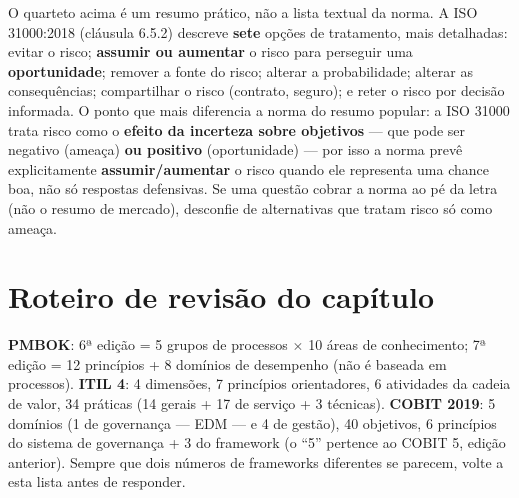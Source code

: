 \begin{cuidado}
O quarteto acima é um resumo prático, não a lista textual da norma. A ISO
31000:2018 (cláusula 6.5.2) descreve \textbf{sete} opções de tratamento,
mais detalhadas: evitar o risco; \textbf{assumir ou aumentar} o risco para
perseguir uma \textbf{oportunidade}; remover a fonte do risco; alterar a
probabilidade; alterar as consequências; compartilhar o risco (contrato,
seguro); e reter o risco por decisão informada. O ponto que mais diferencia
a norma do resumo popular: a ISO 31000 trata risco como o \textbf{efeito da
incerteza sobre objetivos} --- que pode ser negativo (ameaça) \textbf{ou
positivo} (oportunidade) --- por isso a norma prevê explicitamente
\textbf{assumir/aumentar} o risco quando ele representa uma chance boa, não
só respostas defensivas. Se uma questão cobrar a norma ao pé da letra (não
o resumo de mercado), desconfie de alternativas que tratam risco só como
ameaça.
\end{cuidado}

\section{Roteiro de revisão do capítulo}

\begin{regrapratica}
\textbf{PMBOK}: 6ª edição = 5 grupos de processos $\times$ 10 áreas de
conhecimento; 7ª edição = 12 princípios + 8 domínios de desempenho (não é
baseada em processos). \textbf{ITIL 4}: 4 dimensões, 7 princípios
orientadores, 6 atividades da cadeia de valor, 34 práticas (14 gerais + 17
de serviço + 3 técnicas). \textbf{COBIT 2019}: 5 domínios (1 de governança
--- EDM --- e 4 de gestão), 40 objetivos, 6 princípios do sistema de
governança + 3 do framework (o “5” pertence ao COBIT 5, edição anterior).
Sempre que dois números de frameworks diferentes se parecem, volte a esta
lista antes de responder.
\end{regrapratica}
